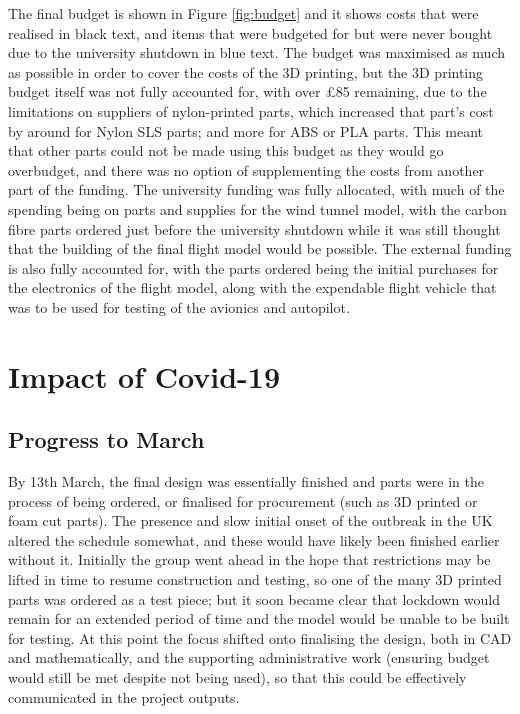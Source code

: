 \documentclass[../../main.tex]{subfiles}
\begin{document}

The final budget is shown in Figure \ref{fig:budget} and it shows costs that were realised in black text, and items that were budgeted for but were never bought due to the university shutdown in blue text.
The budget was maximised as much as possible in order to cover the costs of the 3D printing, but the 3D printing budget itself was not fully accounted for, with over £85 remaining, due to the limitations on suppliers of nylon-printed parts, which increased that part's cost by around  for Nylon SLS parts; and more for ABS or PLA parts.
This meant that other parts could not be made using this budget as they would go overbudget, and there was no option of supplementing the costs from another part of the funding.
The university funding was fully allocated, with much of the spending being on parts and supplies for the wind tunnel model, with the carbon fibre parts ordered just before the university shutdown while it was still thought that the building of the final flight model would be possible.
The external funding is also fully accounted for, with the parts ordered being the initial purchases for the electronics of the flight model, along with the expendable flight vehicle that was to be used for testing of the avionics and autopilot. 

\section{Impact of Covid-19} \label{sec:project-review:impact-of-covid-19}

\subsection{Progress to March} \label{sec:project-review:impact-of-covid-19:progress-to-march}

By 13th March, the final design was essentially finished and parts were in the process of being ordered, or finalised for procurement (such as 3D printed or foam cut parts).
The presence and slow initial onset of the outbreak in the UK altered the schedule somewhat, and these would have likely been finished earlier without it.
Initially the group went ahead in the hope that restrictions may be lifted in time to resume construction and testing, so one of the many 3D printed parts was ordered as a test piece; but it soon became clear that lockdown would remain for an extended period of time and the model would be unable to be built for testing.
At this point the focus shifted onto finalising the design, both in CAD and mathematically, and the supporting administrative work (ensuring budget would still be met despite not being used), so that this could be effectively communicated in the project outputs. 
\end{document}
